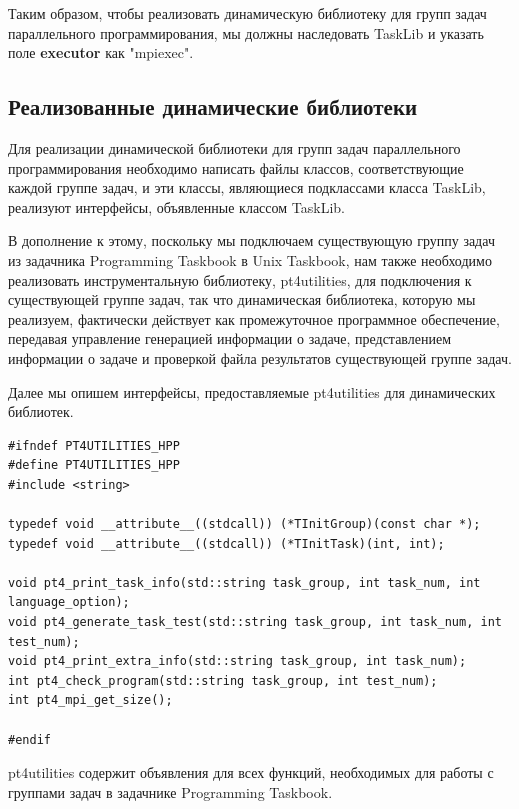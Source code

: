 Таким образом, чтобы реализовать динамическую библиотеку для групп задач параллельного 
программирования, мы должны наследовать TaskLib и указать поле \textbf{executor} как "mpiexec".

\subsection{Реализованные динамические библиотеки}

Для реализации динамической библиотеки для групп задач параллельного программирования
 необходимо написать файлы классов, соответствующие каждой группе задач, и эти 
 классы, являющиеся подклассами класса TaskLib, реализуют интерфейсы, объявленные классом TaskLib.

 В дополнение к этому, поскольку мы подключаем существующую группу задач из задачника Programming Taskbook 
 в Unix Taskbook, нам также необходимо реализовать инструментальную 
 библиотеку, pt4utilities, для подключения к существующей группе задач, так что динамическая 
 библиотека, которую мы реализуем, фактически действует как промежуточное программное обеспечение, 
 передавая управление генерацией информации о задаче, представлением информации о задаче и 
 проверкой файла результатов существующей группе задач.

 Далее мы опишем интерфейсы, предоставляемые pt4utilities для динамических библиотек.

\lstset{language=c++}
\begin{lstlisting}
#ifndef PT4UTILITIES_HPP
#define PT4UTILITIES_HPP
#include <string>

typedef void __attribute__((stdcall)) (*TInitGroup)(const char *);
typedef void __attribute__((stdcall)) (*TInitTask)(int, int);

void pt4_print_task_info(std::string task_group, int task_num, int language_option);
void pt4_generate_task_test(std::string task_group, int task_num, int test_num);
void pt4_print_extra_info(std::string task_group, int task_num);
int pt4_check_program(std::string task_group, int test_num);
int pt4_mpi_get_size();

#endif
\end{lstlisting}

pt4utilities содержит объявления для всех функций, необходимых для работы с группами 
задач в задачнике Programming Taskbook.

